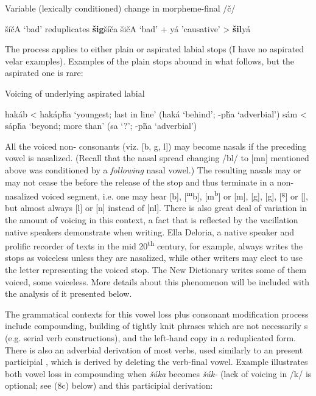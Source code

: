 \documentclass[output=paper]{LSP/langsci}
\begin{document}
\begin{exe}
\ex\label{ex:rood:5}
Variable (lexically conditioned) change in morpheme-final /\v{c}/
\begin{xlist}
\ex \v{s}\'i\v{c}A `bad' reduplicates \textbf{\v{s}ig}\v{s}\'i\v{c}a
\ex \v{s}i\v{c}A `bad' + y\'a 'causative' > \textbf{\v{s}il}y\'a
\end{xlist}
\end{exe}

The process applies to either plain or aspirated labial stops (I have no aspirated velar examples). Examples of the plain stops abound in what follows, but the aspirated one is rare:

\begin{exe}
\ex \label{ex:rood:6}
Voicing of underlying aspirated labial
\begin{xlist}
\ex hak\'ab < hak\'ap\v{h}a `youngest; last in line' (hak\'a `behind'; -p\v{h}a `adverbial')
\ex s\'am < s\'ap\v{h}a `beyond; more than' (sa `?'; -p\v{h}a `adverbial')
\end{xlist}
\end{exe}

All the voiced non- consonants (viz. [b, g, l]) may become nasals if the preceding vowel is nasalized. (Recall that the nasal spread changing /bl/ to [mn] mentioned above was conditioned by a \textit{following} nasal vowel.) The resulting nasals may or may not cease the  before the release of the stop and thus terminate in a non-nasalized voiced segment, i.e. one may hear [b], [\textsuperscript{m}b], [m\textsuperscript{b}] or [m], [g], [\textsuperscript{}g], [\textsuperscript{g}] or [], but almost always [l] or [n] instead of [nl]. There is also great deal of variation in the amount of voicing in this context, a fact that is reflected by the vacillation native speakers demonstrate when writing. Ella Deloria, a native speaker and prolific recorder of  texts in the mid 20\textsuperscript{th} century, for example, always writes the stops as voiceless unless they are nasalized, while other writers may elect to use the letter representing the voiced stop. The New  Dictionary writes some of them voiced, some voiceless. More details about this phenomenon will be included with the analysis of it presented below.

The grammatical contexts for this vowel loss plus consonant modification process include compounding, building of tightly knit phrases which are not necessarily s (e.g. serial verb constructions), and the left-hand copy in a reduplicated form. There is also an adverbial derivation of most verbs, used similarly to an  present participial , which is derived by deleting the verb-final vowel. Example  illustrates both vowel loss in compounding when \textit{\v{s}\'uka} becomes \textit{\v{s}\'uk-} (lack of voicing in /k/ is optional; see (8c) below) and this participial derivation:
\end{document}
